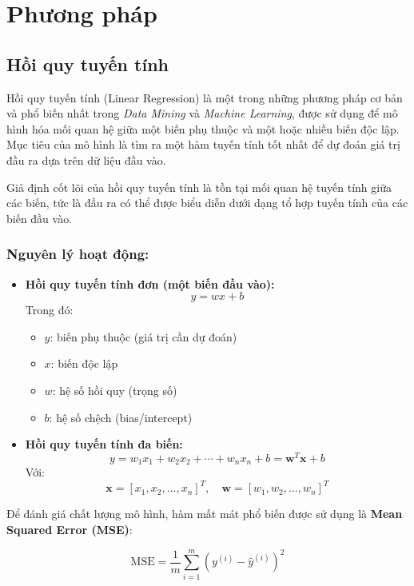 \section{Phương pháp}

\subsection{Hồi quy tuyến tính}

Hồi quy tuyến tính (Linear Regression) là một trong những phương pháp cơ bản và phổ biến nhất trong \textit{Data Mining} và \textit{Machine Learning}, được sử dụng để mô hình hóa mối quan hệ giữa một biến phụ thuộc và một hoặc nhiều biến độc lập. Mục tiêu của mô hình là tìm ra một hàm tuyến tính tốt nhất để dự đoán giá trị đầu ra dựa trên dữ liệu đầu vào.

Giả định cốt lõi của hồi quy tuyến tính là tồn tại mối quan hệ tuyến tính giữa các biến, tức là đầu ra có thể được biểu diễn dưới dạng tổ hợp tuyến tính của các biến đầu vào.

\subsubsection*{Nguyên lý hoạt động:}

\begin{itemize}
    \item \textbf{Hồi quy tuyến tính đơn (một biến đầu vào):}
    \[
        y = wx + b
    \]
    Trong đó:
    \begin{itemize}
        \item $y$: biến phụ thuộc (giá trị cần dự đoán)
        \item $x$: biến độc lập
        \item $w$: hệ số hồi quy (trọng số)
        \item $b$: hệ số chệch (bias/intercept)
    \end{itemize}
    
    \item \textbf{Hồi quy tuyến tính đa biến:}
    \[
        y = w_1x_1 + w_2x_2 + \cdots + w_nx_n + b = \mathbf{w}^T \mathbf{x} + b
    \]
    Với:
    \[
        \mathbf{x} = [x_1, x_2, \ldots, x_n]^T,\quad 
        \mathbf{w} = [w_1, w_2, \ldots, w_n]^T
    \]
\end{itemize}

Để đánh giá chất lượng mô hình, hàm mất mát phổ biến được sử dụng là \textbf{Mean Squared Error (MSE)}:

\[
    \text{MSE} = \frac{1}{m} \sum_{i=1}^{m} \left( y^{(i)} - \hat{y}^{(i)} \right)^2
\]

